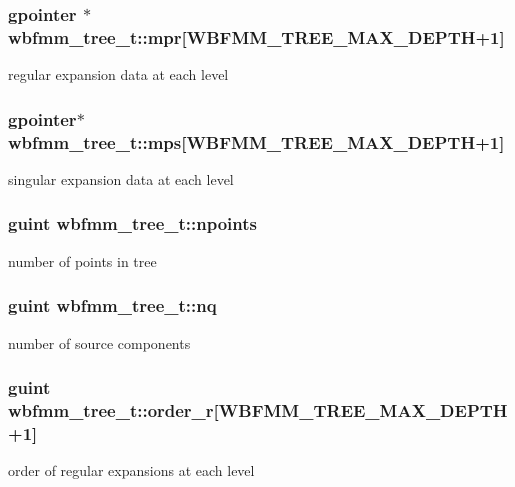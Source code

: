 \subsubsection[{mpr}]{\setlength{\rightskip}{0pt plus 5cm}gpointer $\ast$ wbfmm\+\_\+tree\+\_\+t\+::mpr[W\+B\+F\+M\+M\+\_\+\+T\+R\+E\+E\+\_\+\+M\+A\+X\+\_\+\+D\+E\+P\+T\+H+1]}\label{structwbfmm__tree__t_ac47b0aef61e58e198fa06d40e0eff738}
regular expansion data at each level 
\subsubsection[{mps}]{\setlength{\rightskip}{0pt plus 5cm}gpointer$\ast$ wbfmm\+\_\+tree\+\_\+t\+::mps[W\+B\+F\+M\+M\+\_\+\+T\+R\+E\+E\+\_\+\+M\+A\+X\+\_\+\+D\+E\+P\+T\+H+1]}\label{structwbfmm__tree__t_aaa852afe822a466d84b51c3fb53b5e7b}
singular expansion data at each level 
\subsubsection[{npoints}]{\setlength{\rightskip}{0pt plus 5cm}guint wbfmm\+\_\+tree\+\_\+t\+::npoints}\label{structwbfmm__tree__t_a05dd3977f0f6f9266dfe5b4de1fd94ea}
number of points in tree 
\subsubsection[{nq}]{\setlength{\rightskip}{0pt plus 5cm}guint wbfmm\+\_\+tree\+\_\+t\+::nq}\label{structwbfmm__tree__t_a4201af7a54bb9d81e588ab619cecabbd}
number of source components 
\subsubsection[{order\+\_\+r}]{\setlength{\rightskip}{0pt plus 5cm}guint wbfmm\+\_\+tree\+\_\+t\+::order\+\_\+r[W\+B\+F\+M\+M\+\_\+\+T\+R\+E\+E\+\_\+\+M\+A\+X\+\_\+\+D\+E\+P\+T\+H+1]}\label{structwbfmm__tree__t_a3977c9974da5fbeaa66a9b1eea6fd235}
order of regular expansions at each level 
